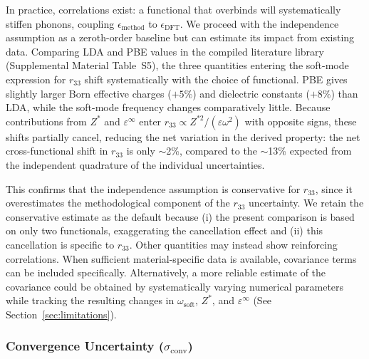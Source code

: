 \documentclass[prb,twocolumn,superscriptaddress,amsmath,amssymb,longbibliography]{revtex4-2}
\newcommand{\conv}{\mathrm{conv}}
\newcommand{\meth}{\mathrm{method}}
\begin{document}
In practice, correlations exist: 
a functional that overbinds will systematically stiffen phonons, coupling 
$\epsilon_\meth$ to $\epsilon_{\mathrm{DFT}}$. We proceed with the 
independence assumption as a zeroth-order baseline but can estimate its 
impact from existing data. Comparing LDA and PBE values in the compiled literature 
library (Supplemental Material Table~S5), the three quantities entering the soft-mode expression for $r_{33}$ shift systematically with the choice of functional. PBE gives slightly larger Born effective charges ($+5\%$) and dielectric constants ($+8\%$) than LDA, while the soft-mode frequency changes comparatively little.  Because contributions from $Z^*$ and $\varepsilon^\infty$ enter $r_{33} \propto 
Z^{*2}/(\varepsilon \omega^2)$ with opposite signs, these shifts partially cancel, reducing the net variation in the derived property: the net cross-functional shift 
in $r_{33}$ is only $\sim$2\%, compared to the $\sim$13\% expected from the independent 
quadrature of the individual uncertainties. 

This confirms that the independence  assumption is conservative for $r_{33}$, since it overestimates the methodological component of the $r_{33}$ uncertainty. We retain the conservative estimate as the default because (i) the present comparison is based on only two functionals, exaggerating the cancellation effect and (ii) this cancellation is specific to 
$r_{33}$. Other quantities may instead show reinforcing correlations. When sufficient material-specific data is available, covariance terms can be included specifically.
Alternatively, a more reliable estimate of the covariance could be obtained by systematically varying numerical parameters while tracking the resulting changes in 
$\omega_{\mathrm{soft}}$, $Z^*$, and $\varepsilon^\infty$  (See Section~\ref{sec:limitations}).

\subsubsection{Convergence Uncertainty ($\sigma_\conv$)}
\end{document}
